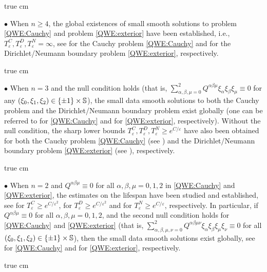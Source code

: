 \documentclass[11pt,twoside]{article}
\def\SS{\mathop{\mathbb S\kern 0pt}\nolimits}
\def\ds{\displaystyle}
\def\ve{\varepsilon}
\theoremstyle{plain}
\theoremstyle{definition}
\numberwithin{equation}{section}
\begin{document}
 true cm

$\bullet$  When $n\ge4$, the global existences of small smooth solutions to problem \eqref{QWE:Cauchy} and
 problem \eqref{QWE:exterior} have been established, i.e., $T_{\ve}^{C}, T_{\ve}^{D}, T_{\ve}^{N}=\infty$, see \cite{Hormander97book,Klainerman80,KP83,Li-Chen} for the Cauchy problem \eqref{QWE:Cauchy} and \cite{Chen89,Hayashi94,MetcalfeSogge06,Shib-Tsuti85,Shib-Tsuti86} for the Dirichlet/Neumann boundary problem \eqref{QWE:exterior}, respectively.
 
 true cm

$\bullet$ When $n=3$ and the null condition holds (that is, $\ds\sum_{\alpha,\beta,\mu=0}^2Q^{\alpha\beta\mu}\xi_{\alpha}\xi_{\beta}\xi_{\mu}\equiv0$
for any $(\xi_0,\xi_1,\xi_2)\in\{\pm1\}\times\SS$), the small data  smooth solutions to both the Cauchy problem
and the Dirichlet/Neumann boundary problem exist globally (one can be referred to \cite{Christodoulou86,Klainerman} for \eqref{QWE:Cauchy} and \cite{Godin95,KSS00,Li-Yin18,MetcalfeSogge05} for \eqref{QWE:exterior}, respectively).
Without the null condition, the sharp lower bounds $T^C_{\ve}, T_{\ve}^D, T_{\ve}^N\ge e^{C/\ve}$ have also been obtained
for both the Cauchy problem \eqref{QWE:Cauchy} (see \cite{JohnKlainerman84}) and the Dirichlet/Neumann boundary problem \eqref{QWE:exterior} (see \cite{Godin89,Godin08,KSS02jam,KSS04,Yuan22,ZhaWang22}), respectively.

 true cm

$\bullet$ When $n=2$ and $Q^{\alpha\beta\mu}\equiv0$ for all $\alpha,\beta,\mu=0,1,2$ in \eqref{QWE:Cauchy} and \eqref{QWE:exterior}, the estimates on the lifespan have been studied and established, see \cite{Alinhac01b,Godin93,Kovalyov87,Hoshiga95} for $T_{\ve}^{C}\ge e^{C/\ve^2}$, \cite{Kubo14} for $T_{\ve}^{D}\ge e^{C/\ve^2}$ and \cite{KKL13} for $T_{\ve}^{N}\ge e^{C/\ve}$, respectively.
In particular, if $Q^{\alpha\beta\mu}\equiv0$ for all $\alpha,\beta,\mu=0,1,2$, and
the second null condition holds for \eqref{QWE:Cauchy} and \eqref{QWE:exterior} (that is, $\ds\sum_{\alpha,\beta,\mu,\nu=0}^2Q^{\alpha\beta\mu\nu}\xi_{\alpha}\xi_{\beta}\xi_{\mu}\xi_{\nu}\equiv0$ for all $(\xi_0,\xi_1,\xi_2)\in\{\pm1\}\times\SS$), then the small data smooth solutions exist globally, see \cite{Katayama95} for \eqref{QWE:Cauchy} and \cite{Kubo13,HouYinYuan26} for \eqref{QWE:exterior}, respectively.

 true cm
\end{document}
